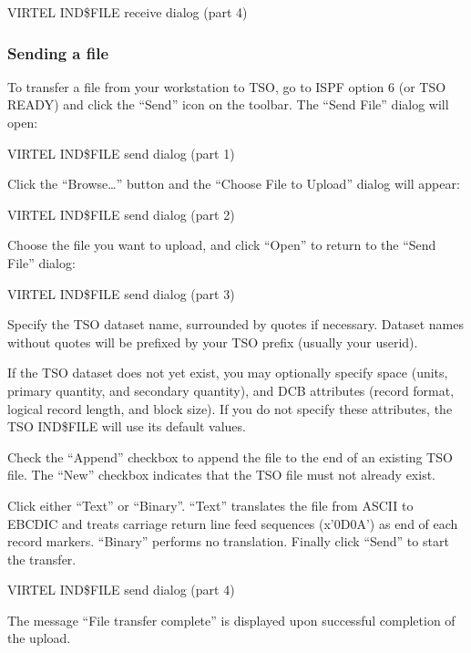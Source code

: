 \documentclass[letterpaper,10pt,english]{sphinxmanual}
\begin{document}
VIRTEL IND\$FILE receive dialog (part 4)


\subsubsection{Sending a file}
\label{\detokenize{User_Guide:sending-a-file}}
To transfer a file from your workstation to TSO, go to ISPF option 6 (or TSO READY) and click the “Send” icon on the
toolbar. The “Send File” dialog will open:

VIRTEL IND\$FILE send dialog (part 1)

Click the “Browse…” button and the “Choose File to Upload” dialog will appear:

VIRTEL IND\$FILE send dialog (part 2)

Choose the file you want to upload, and click “Open” to return to the “Send File” dialog:


VIRTEL IND\$FILE send dialog (part 3)

Specify the TSO dataset name, surrounded by quotes if necessary. Dataset names without quotes will be prefixed by
your TSO prefix (usually your userid).

If the TSO dataset does not yet exist, you may optionally specify space (units, primary quantity, and secondary
quantity), and DCB attributes (record format, logical record length, and block size). If you do not specify these
attributes, the TSO IND\$FILE will use its default values.

Check the “Append” checkbox to append the file to the end of an existing TSO file. The “New” checkbox indicates that
the TSO file must not already exist.

Click either “Text” or “Binary”. “Text” translates the file from ASCII to EBCDIC and treats carriage return line feed
sequences (x’0D0A’) as end of each record markers. “Binary” performs no translation. Finally click “Send” to start the
transfer.


VIRTEL IND\$FILE send dialog (part 4)

The message “File transfer complete” is displayed upon successful completion of the upload.
\end{document}
